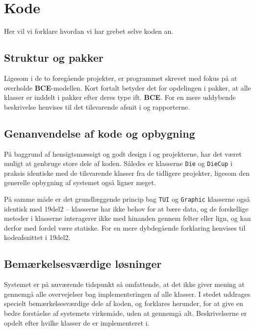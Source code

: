 \section{Kode}
Her vil vi forklare hvordan vi har grebet selve koden an.
\subsection{Struktur og pakker}
Ligesom i de to foregående projekter, er programmet skrevet med fokus på at overholde \textbf{BCE}-modellen. Kort fortalt betyder det for opdelingen i pakker, at alle klasser er inddelt i pakker efter deres type ift. \textbf{BCE}. For en mere uddybende beskrivelse henvises til det tilsvarende afsnit i \cite{19del1} og \cite{19del2} rapporterne.
\subsection{Genanvendelse af kode og opbygning}
På baggrund af hensigtsmæssigt og godt design i \cite{19del1} og \cite{19del2} projekterne, har det været muligt at genbruge store dele af koden. Således er klasserne \texttt{Die} og \texttt{DieCup} i praksis identiske med de tilsvarende klasser fra de tidligere projekter, ligesom den generelle opbygning af systemet også ligner meget.

På samme måde er det grundlæggende princip bag \texttt{TUI} og \texttt{Graphic} klasserne også identisk med 19del2 – klasserne har ikke behov for at bære data, og de forskellige metoder i klasserne interagerer ikke med hinanden gennem felter eller lign, og kan derfor med fordel være statiske. For en mere dybdegående forklaring henvises til kodeafsnittet i 19del2.

\subsection{Bemærkelsesværdige løsninger}
Systemet er på nuværende tidspunkt så omfattende, at det ikke giver mening at gennemgå alle overvejelser bag implementeringen af alle klasser. I stedet uddrages specielt bemærkelsesværdige dele af koden, og forklares herunder, for at give en bedre forståelse af systemets virkemåde, uden at gennemgå alt. Beskrivelserne er opdelt efter hvilke klasser de er implementeret i.
